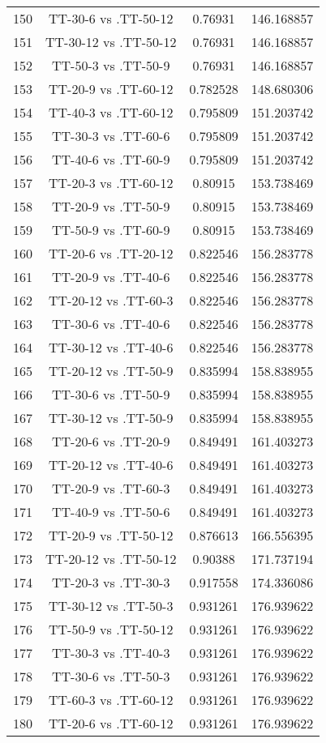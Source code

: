 \documentclass[a4paper,10pt]{article}
\begin{document}
\begin{landscape}
\begin{table}[!htp]
\begin{tabular}{cccc}
150&TT-30-6 vs .TT-50-12&0.76931&146.168857\\
151&TT-30-12 vs .TT-50-12&0.76931&146.168857\\
152&TT-50-3 vs .TT-50-9&0.76931&146.168857\\
153&TT-20-9 vs .TT-60-12&0.782528&148.680306\\
154&TT-40-3 vs .TT-60-12&0.795809&151.203742\\
155&TT-30-3 vs .TT-60-6&0.795809&151.203742\\
156&TT-40-6 vs .TT-60-9&0.795809&151.203742\\
157&TT-20-3 vs .TT-60-12&0.80915&153.738469\\
158&TT-20-9 vs .TT-50-9&0.80915&153.738469\\
159&TT-50-9 vs .TT-60-9&0.80915&153.738469\\
160&TT-20-6 vs .TT-20-12&0.822546&156.283778\\
161&TT-20-9 vs .TT-40-6&0.822546&156.283778\\
162&TT-20-12 vs .TT-60-3&0.822546&156.283778\\
163&TT-30-6 vs .TT-40-6&0.822546&156.283778\\
164&TT-30-12 vs .TT-40-6&0.822546&156.283778\\
165&TT-20-12 vs .TT-50-9&0.835994&158.838955\\
166&TT-30-6 vs .TT-50-9&0.835994&158.838955\\
167&TT-30-12 vs .TT-50-9&0.835994&158.838955\\
168&TT-20-6 vs .TT-20-9&0.849491&161.403273\\
169&TT-20-12 vs .TT-40-6&0.849491&161.403273\\
170&TT-20-9 vs .TT-60-3&0.849491&161.403273\\
171&TT-40-9 vs .TT-50-6&0.849491&161.403273\\
172&TT-20-9 vs .TT-50-12&0.876613&166.556395\\
173&TT-20-12 vs .TT-50-12&0.90388&171.737194\\
174&TT-20-3 vs .TT-30-3&0.917558&174.336086\\
175&TT-30-12 vs .TT-50-3&0.931261&176.939622\\
176&TT-50-9 vs .TT-50-12&0.931261&176.939622\\
177&TT-30-3 vs .TT-40-3&0.931261&176.939622\\
178&TT-30-6 vs .TT-50-3&0.931261&176.939622\\
179&TT-60-3 vs .TT-60-12&0.931261&176.939622\\
180&TT-20-6 vs .TT-60-12&0.931261&176.939622\\

\end{tabular}
\end{table}
\end{landscape}
\end{document}
